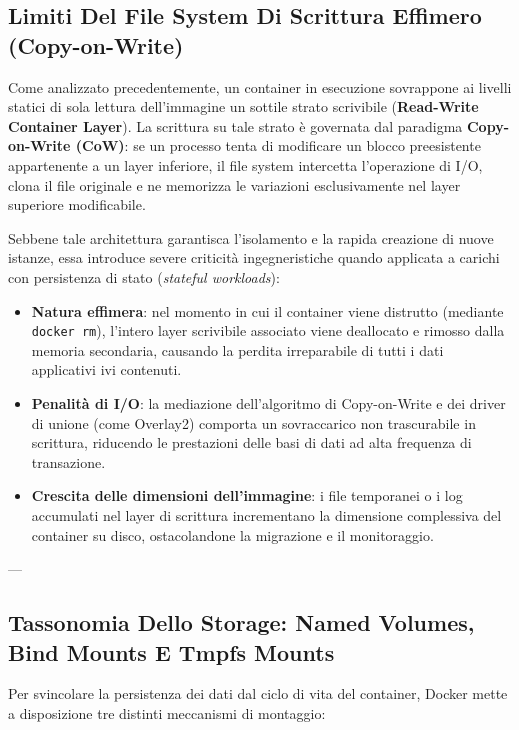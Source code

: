 \documentclass[11pt, a4paper]{article}
\begin{document}
\subsection{Limiti Del File System Di Scrittura Effimero (Copy-on-Write)}

Come analizzato precedentemente, un container in esecuzione sovrappone ai livelli statici di sola lettura dell'immagine un sottile strato scrivibile (\textbf{Read-Write Container Layer}). La scrittura su tale strato è governata dal paradigma \textbf{Copy-on-Write (CoW)}: se un processo tenta di modificare un blocco preesistente appartenente a un layer inferiore, il file system intercetta l'operazione di I/O, clona il file originale e ne memorizza le variazioni esclusivamente nel layer superiore modificabile.

Sebbene tale architettura garantisca l'isolamento e la rapida creazione di nuove istanze, essa introduce severe criticità ingegneristiche quando applicata a carichi con persistenza di stato (\emph{stateful workloads}):
\begin{itemize}
    \item \textbf{Natura effimera}: nel momento in cui il container viene distrutto (mediante \texttt{docker rm}), l'intero layer scrivibile associato viene deallocato e rimosso dalla memoria secondaria, causando la perdita irreparabile di tutti i dati applicativi ivi contenuti.
    \item \textbf{Penalità di I/O}: la mediazione dell'algoritmo di Copy-on-Write e dei driver di unione (come Overlay2) comporta un sovraccarico non trascurabile in scrittura, riducendo le prestazioni delle basi di dati ad alta frequenza di transazione.
    \item \textbf{Crescita delle dimensioni dell'immagine}: i file temporanei o i log accumulati nel layer di scrittura incrementano la dimensione complessiva del container su disco, ostacolandone la migrazione e il monitoraggio.
\end{itemize}

---

\subsection{Tassonomia Dello Storage: Named Volumes, Bind Mounts E Tmpfs Mounts}

Per svincolare la persistenza dei dati dal ciclo di vita del container, Docker mette a disposizione tre distinti meccanismi di montaggio:

\end{document}
